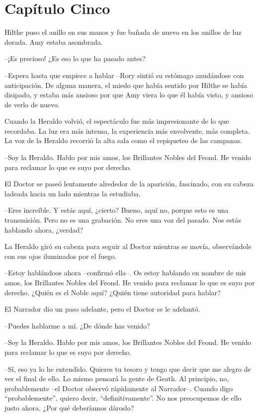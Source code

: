 \chapter*{Capítulo Cinco}

{Hilthe puso el anillo en sus manos y fue bañada de nuevo en los anillos
de luz dorada. Amy estaba asombrada.}

{--¡Es precioso! ¿Es eso lo que ha pasado antes?}

{--Espera hasta que empiece a hablar --Rory sintió su estómago
	anudándose con anticipación. De alguna manera, el miedo que había
	sentido por Hilthe se había disipado, y estaba más ansioso por que Amy
viera lo que él había visto, y ansioso de verlo de nuevo.}

{Cuando la Heraldo volvió, el espectáculo fue más impresionante de lo
	que recordaba. La luz era más intensa, la experiencia más envolvente,
	más completa. La voz de la Heraldo recorrió la alta sala como el
repiqueteo de las campanas.}

{--Soy la Heraldo. Hablo por mis amos, los Brillantes Nobles del
Feond. He venido para reclamar lo que es suyo por derecho.}

{El Doctor se paseó lentamente alrededor de la aparición, fascinado, con
su cabeza ladeada hacia un lado mientras la estudiaba.}

{--Eres increíble. Y estás aquí, ¿cierto? Bueno, aquí no, porque esto
	es una transmisión. Pero no es una grabación. No eres una voz del
pasado. Nos estás hablando ahora, ¿verdad?}

{La Heraldo giró su cabeza para seguir al Doctor mientras se movía,
observándole con sus ojos iluminados por el fuego.}

{--Estoy hablándoos ahora --confirmó ella--. Os estoy hablando en
	nombre de mis amos, los Brillantes Nobles del Feond. He venido para
	reclamar lo que es suyo por derecho. ¿Quién es el Noble aquí? ¿Quién
tiene autoridad para hablar?}

{El Narrador dio un paso adelante, pero el Doctor se le adelantó.}

{--Puedes hablarme a mí. ¿De dónde has venido?}

{--Soy la Heraldo. Hablo por mis amos, los Brillantes Nobles del
Feond. He venido para reclamar lo que es suyo por derecho.}

{--Sí, eso ya lo he entendido. Quieres tu tesoro y tengo que decir que
	me alegro de ver el final de ello. Lo mismo pensará la gente de Geath.
	Al principio, no, probablemente --el Doctor observó rápidamente al
	Narrador--. Cuando digo ``probablemente'', quiero decir,
	``definitivamente''. No nos preocupemos de ello justo ahora. ¿Por qué
deberíamos dároslo?}

